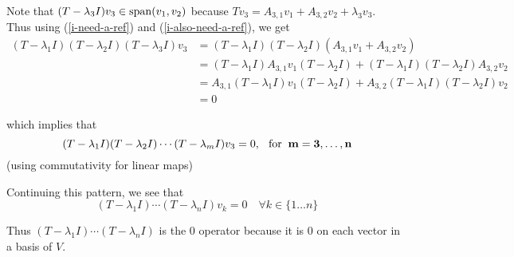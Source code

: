 \begin{prf}
  Note that $(T-\lambda_3 I) v_3 \in \operatorname{span} (v_1, v_2)$ because $T v_3 = A_{3,1} v_1 +   A_{3,2} v_2 + \lambda_3 v_3$. \\
  Thus using (\ref{i-need-a-ref}) and (\ref{i-also-need-a-ref}), we get
  \begin{equation}
    \begin{aligned}
    (T- \lambda_1 I) (T- \lambda_2 I) (T- \lambda_3 I)v_3 
    &=(T- \lambda_1 I) (T- \lambda_2 I)(A_{3,1} v_1 +   A_{3,2} v_2)  \\
    &= (T- \lambda_1 I)A_{3,1} v_1(T- \lambda_2 I)+(T- \lambda_1 I)(T- \lambda_2 I)A_{3,2} v_2 \\
    &= A_{3,1}(T- \lambda_1 I) v_1(T- \lambda_2 I)+A_{3,2}(T- \lambda_1 I)(T- \lambda_2 I) v_2 \\
    &= 0
    \end{aligned}
  \end{equation}
  
  which implies that
  \begin{equation}
    (T-\lambda_1 I) (T-\lambda_2 I) \cdots (T-\lambda_m I) v_3= 0, \;\;\, \text{for}\;\; \mathbf{m = 3, \ldots, n}
  \end{equation}
  (using commutativity for linear maps)
  \bigbreak
  
  Continuing this pattern, we see that
  \begin{equation}
    (T-\lambda_1 I) \cdots (T- \lambda_n I) v_k = 0 \quad \forall k \in \{ 1\ldots n \}
  \end{equation}
  
  Thus $(T-\lambda_1 I) \cdots (T- \lambda_n I)$ is the $0$ operator because it is $0$ on each vector in a basis of $V$.
  
\end{prf}


